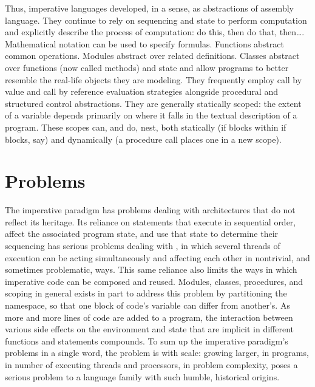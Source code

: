 Thus, imperative languages developed, in a sense, as abstractions of assembly language. They continue to rely on sequencing and state to perform computation and explicitly describe the process of computation: do this, then do that, then\dots. Mathematical notation can be used to specify formulas. Functions abstract common operations. Modules abstract over related definitions. Classes abstract over functions (now called methods) and state and allow programs to better resemble the real-life objects they are modeling. They frequently employ call by value and call by reference evaluation strategies alongside procedural and structured control abstractions. They are generally statically scoped: the extent of a variable depends primarily on where it falls in the textual description of a program. These scopes can, and do, nest, both statically (if blocks within if blocks, say) and dynamically (a procedure call places one in a new scope).%

\section{Problems}
The imperative paradigm has problems dealing with architectures that do not reflect its heritage. Its reliance on statements that execute in sequential order, affect the associated program state, and use that state to determine their sequencing has serious problems dealing with , in which several threads of execution can be acting simultaneously and affecting each other in nontrivial, and sometimes problematic, ways. This same reliance also limits the ways in which imperative code can be composed and reused. Modules, classes, procedures, and scoping in general exists in part to address this problem by partitioning the namespace, so that one block of code's variable  can differ from another's. As more and more lines of code are added to a program, the interaction between various side effects on the environment and state that are implicit in different functions and statements compounds. To sum up the imperative paradigm's problems in a single word, the problem is with scale: growing larger, in programs, in number of executing threads and processors, in problem complexity, poses a serious problem to a language family with such humble, historical origins.

